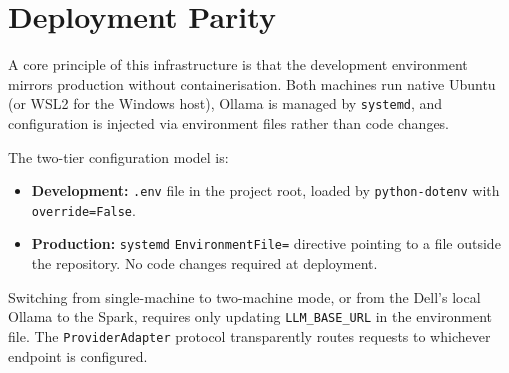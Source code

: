 \section{Deployment Parity}
\label{sec:parity}

A core principle of this infrastructure is that the development
environment mirrors production without containerisation. Both machines
run native Ubuntu (or WSL2 for the Windows host), Ollama is managed by
\texttt{systemd}, and configuration is injected via environment files
rather than code changes.

The two-tier configuration model is:

\begin{itemize}
  \item \textbf{Development:} \texttt{.env} file in the project root,
        loaded by \texttt{python-dotenv} with \texttt{override=False}.
  \item \textbf{Production:} \texttt{systemd} \texttt{EnvironmentFile=}
        directive pointing to a file outside the repository. No code
        changes required at deployment.
\end{itemize}

Switching from single-machine to two-machine mode, or from the Dell's
local Ollama to the Spark, requires only updating \texttt{LLM\_BASE\_URL}
in the environment file. The \texttt{ProviderAdapter} protocol
transparently routes requests to whichever endpoint is configured.